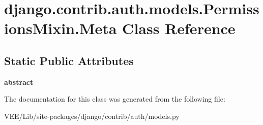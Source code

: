 \hypertarget{classdjango_1_1contrib_1_1auth_1_1models_1_1_permissions_mixin_1_1_meta}{}\section{django.\+contrib.\+auth.\+models.\+Permissions\+Mixin.\+Meta Class Reference}
\label{classdjango_1_1contrib_1_1auth_1_1models_1_1_permissions_mixin_1_1_meta}
\subsection*{Static Public Attributes}
\begin{DoxyCompactItemize}
\item 
\mbox{\label{classdjango_1_1contrib_1_1auth_1_1models_1_1_permissions_mixin_1_1_meta_a0edf677bec0725c817c20b49861e4e30}} 
{\bfseries abstract}
\end{DoxyCompactItemize}


The documentation for this class was generated from the following file\+:\begin{DoxyCompactItemize}
\item 
V\+E\+E/\+Lib/site-\/packages/django/contrib/auth/models.\+py\end{DoxyCompactItemize}
